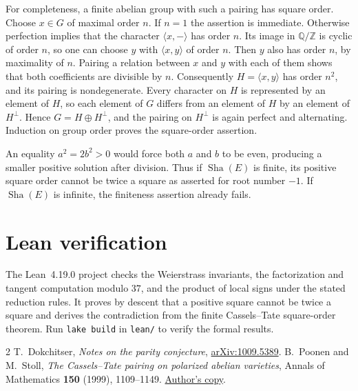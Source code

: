 \documentclass[11pt]{article}
\newcommand{\Sha}{\operatorname{Sha}}
\begin{document}
For completeness, a finite abelian group with such a pairing
has square order. Choose \(x\in G\) of maximal order \(n\).
If \(n=1\) the assertion is immediate. Otherwise perfection
implies that the character \(\langle x,-\rangle\) has order \(n\).
Its image in \(\mathbb Q/\mathbb Z\) is cyclic of order \(n\),
so one can choose \(y\) with \(\langle x,y\rangle\) of order
\(n\). Then \(y\) also has order \(n\), by maximality of \(n\).
Pairing a relation between \(x\) and \(y\) with each of them
shows that both coefficients are divisible by \(n\). Consequently
\(H=\langle x,y\rangle\) has order \(n^2\), and its pairing is
nondegenerate. Every character on \(H\) is represented by an element
of \(H\), so each element of \(G\) differs from an element of \(H\)
by an element of \(H^\perp\). Hence \(G=H\oplus H^\perp\), and the
pairing on \(H^\perp\) is again perfect and alternating. Induction
on group order proves the square-order assertion.

An equality \(a^2=2b^2>0\) would force both \(a\) and \(b\) to
be even, producing a smaller positive solution after division.
Thus if \(\Sha(E)\) is finite, its positive square order cannot
be twice a square as asserted for root number \(-1\).
If \(\Sha(E)\) is infinite, the finiteness assertion already fails.

\section*{Lean verification}

The Lean~4.19.0 project checks the Weierstrass invariants, the
factorization and tangent computation modulo \(37\), and the
product of local signs under the stated reduction rules. It
proves by descent that a positive square cannot be twice a square
and derives the contradiction from the finite Cassels--Tate
square-order theorem. Run \verb|lake build| in \verb|lean/| to
verify the formal results.

\begin{thebibliography}{2}
T.~Dokchitser, \emph{Notes on the parity conjecture},
\href{https://arxiv.org/abs/1009.5389}{arXiv:1009.5389}.
B.~Poonen and M.~Stoll,
\emph{The Cassels--Tate pairing on polarized abelian varieties},
Annals of Mathematics \textbf{150} (1999), 1109--1149.
\href{https://math.mit.edu/~poonen/papers/sha.pdf}{Author's copy}.
\end{thebibliography}
\end{document}
